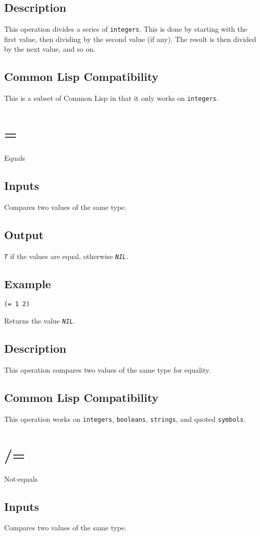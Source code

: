 \documentclass[10pt, openany]{book}
\newcommand{\constant}[1]{\emph{\texttt{#1}}}
\newcommand{\datatype}[1]{\texttt{#1}}
\newcommand{\cl}{Common Lisp}
\begin{document}
\subsection{Description}
This operation divides a series of \datatype{integers}.  This is done by starting with the first value, then dividing by the second value (if any).  The result is then divided by the next value, and so on.
\subsection{Common Lisp Compatibility}
This is a subset of \cl{} in that it only works on \datatype{integers}.

\section{=}
Equals
\subsection{Inputs}
Compares two values of the same type.
\subsection{Output}
\constant{T} if the values are equal, otherwise \constant{NIL}.
\subsection{Example}
\begin{lstlisting}
(= 1 2)
\end{lstlisting}
Returns the value \constant{NIL}.
\subsection{Description}
This operation compares two values of the same type for equality.
\subsection{Common Lisp Compatibility}
This operation works on \datatype{integers}, \datatype{booleans}, \datatype{strings}, and quoted \datatype{symbols}.

\section{/=}
Not-equals
\subsection{Inputs}
Compares two values of the same type.
\end{document}
